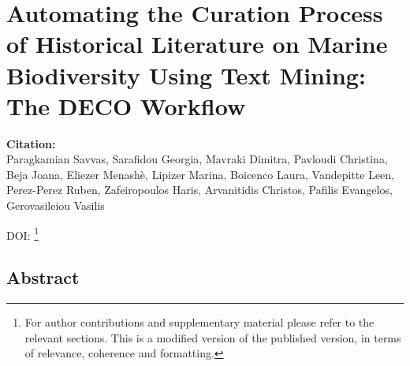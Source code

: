 % 
% 


\chapter{Automating the Curation Process of Historical Literature on Marine Biodiversity Using Text Mining: The DECO Workflow}
\label{cha:deco}


\textbf{Citation:} \\ 
Paragkamian Savvas, Sarafidou Georgia, Mavraki Dimitra, Pavloudi Christina, Beja Joana, Eliezer Menashè, Lipizer Marina, Boicenco Laura, Vandepitte Leen, Perez-Perez Ruben, Zafeiropoulos Haris, Arvanitidis Christos, Pafilis Evangelos, Gerovasileiou Vasilis

DOI: \href{https://www.frontiersin.org/articles/10.3389/fmars.2022.940844}\footnote{
   For author contributions and supplementary material please refer to the relevant sections. 
   This is a modified version of the published version,
   in terms of relevance, coherence and formatting.
   }



\section{Abstract}

